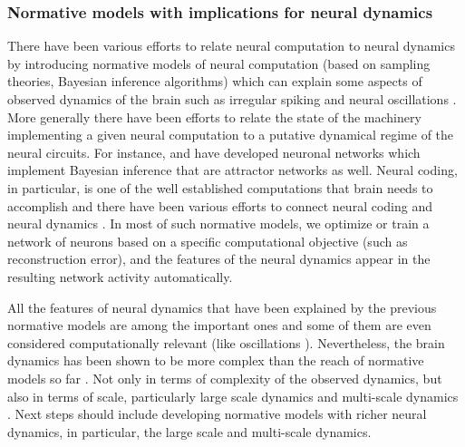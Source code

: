 \subsubsection{Normative models with implications for neural dynamics}\label{sec:norm-models-with}
There have been various efforts to relate neural computation to neural dynamics by introducing normative models of neural computation (\eg based on sampling theories, Bayesian inference algorithms) which can explain some aspects of observed dynamics of the brain such as irregular spiking and neural oscillations
\cite{ermentroutRelatingNeuralDynamics2007c,buesingNeuralDynamicsSampling2011,boerlinPredictiveCodingDynamical2013,billDistributedBayesianComputation2015,chalkNeuralOscillationsSignature2016,mastrogiuseppeLinkingConnectivityDynamics2018,echevesteCorticallikeDynamicsRecurrent2020,dubreuilComplementaryRolesDimensionality2020}.
More generally there have been efforts to relate the state of the machinery implementing a given neural computation to a putative dynamical regime of the neural circuits.
For instance, \citet{echevesteCorticallikeDynamicsRecurrent2020} and \citet{lengyelMatchingStorageRecall2005} have developed neuronal networks which implement Bayesian inference
that are attractor networks as well.
Neural coding, in particular, is one of the well established computations that brain needs to accomplish \cite{quianquirogaPrinciplesNeuralCoding2013}
and there have been various efforts to connect neural coding and neural dynamics \cite{ermentroutRelatingNeuralDynamics2007c,boerlinPredictiveCodingDynamical2013,chalkNeuralOscillationsSignature2016,echevesteCorticallikeDynamicsRecurrent2020}.
In most of such normative models, we optimize or train a network of neurons based on a specific computational objective (such as reconstruction error),
and the features of the neural dynamics appear in the resulting network activity automatically.

All the features of neural dynamics that have been explained by the previous normative models are among the important ones and some  of them are even considered computationally relevant
(like oscillations \cite{chalkNeuralOscillationsSignature2016,petersonHealthyOscillatoryCoordination2018}).
Nevertheless, the brain dynamics has been shown to be more complex than the reach of normative models so far \cite{decoDynamicBrainSpiking2008,breakspearDynamicModelsLargescale2017}.
Not only in terms of complexity of the observed dynamics,
but also in terms of scale, particularly large scale dynamics
and multi-scale dynamics \cite{freemanScalefreeNeocorticalDynamics2007a,agrawalScaleChangeSymmetryRules2019}.
Next steps should include developing normative models with richer neural dynamics, in particular, the large scale and multi-scale dynamics.


